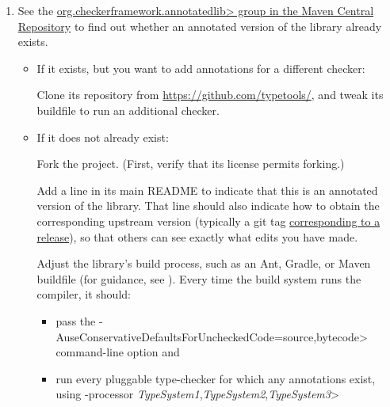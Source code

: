 \begin{enumerate}
\item See the
  \href{https://central.sonatype.com/search?q=org.checkerframework.annotatedlib}{\<org.checkerframework.annotatedlib>
    group in the Maven Central Repository}
  to find out whether an annotated version of the library already exists.

  \begin{itemize}
  \item
    If it exists, but you want to add annotations for a different checker:

    Clone its repository from \url{https://github.com/typetools/}, and tweak
    its buildfile to run an additional checker.

  \item
    If it does not already exist:

    Fork the project.  (First, verify that its license permits forking.)

    Add a line in its main README to indicate that this is an annotated
    version of the library.  That line should also indicate how to obtain
    the corresponding upstream version (typically a git tag
    \href{https://htmlpreview.github.io/?https://github.com/eisop/checker-framework/master/docs/developer/developer-manual.html#annotated-library-version-numbers}{corresponding
      to a release}), so that others can see exactly what edits you have
    made.

  Adjust the library's
  build process, such as an Ant, Gradle, or Maven buildfile (for guidance,
  see ).
    Every time the build system runs the compiler, it should:
    \begin{itemize}
    \item
      pass the \<-AuseConservativeDefaultsForUncheckedCode=source,bytecode>
      command-line option and
    \item
      run every pluggable type-checker for which any
      annotations exist, using \<-processor
      \emph{TypeSystem1},\emph{TypeSystem2},\emph{TypeSystem3}>
    \end{itemize}


\end{itemize}
\end{enumerate}
